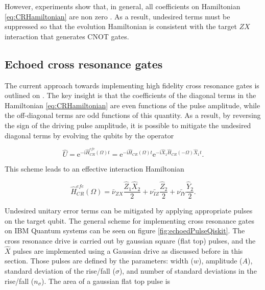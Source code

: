     \noindent However, experiments show that, in general, all coefficients on Hamiltonian \ref{eq:CRHamiltonian} are non zero \cite{DuplicatedRXZPulse, 2016RZXCalibration}. As a result, undesired terms must be suppressed so that the evolution Hamiltonian is consistent with the target $ZX$ interaction that generates CNOT gates.

  \subsection{Echoed cross resonance gates}
  \label{subsec:EchoedCrossResonance}

    The current approach towards implementing high fidelity cross resonance gates is outlined on \cite{DuplicatedRXZPulse}. The key insight is that the coefficients of the diagonal terms in the Hamiltonian \ref{eq:CRHamiltonian} are even functions of the pulse amplitude, while the off-diagonal terms are odd functions of this quantity. As a result, by reversing the sign of the driving pulse amplitude, it is possible to mitigate the undesired diagonal terms by evolving the qubits by the operator

    \begin{equation}
      \hat{U} = \mathrm{e}^{-\mathrm{i}\hat{H}_{CR}^{efe}(\Omega)t} = \mathrm{e}^{-\mathrm{i}\hat{H}_{CR}(\Omega)t} \mathrm{e}^{-\mathrm{i}\hat{X}_1\hat{H}_{CR}(-\Omega)\hat{X}_1t}.
      \label{eq:pulseCREvolution}
    \end{equation}

    \noindent This scheme leads to an effective interaction Hamiltonian \cite{DuplicatedRXZPulse}

    \begin{equation}
      \hat{H}_{CR}^{efe}(\Omega) = \bar{\nu}_{ZX} \frac{\hat{Z}_1\hat{X}_2}{2} + \bar{\nu_{IZ}} \frac{\hat{Z}_2}{2} + \bar{\nu_{IY}} \frac{\hat{Y}_2}{2}.
      \label{eq:effectiveHamiltonian}
    \end{equation}

    Undesired unitary error terms can be mitigated by applying appropriate pulses on the target qubit. The general scheme for implementing cross resonance gates on IBM Quantum systems can be seen on figure \ref{fig:echoedPulseQiskit}. The cross resonance drive is carried out by gaussian square (flat top) pulses, and the $\hat{X}$ pulses are implemented using a Gaussian drive as discussed before in this section. Those pulses are defined by the parameters: width ($w$), amplitude ($A$), standard deviation of the rise/fall ($\sigma$), and number of standard deviations in the rise/fall ($n_\sigma$). The area of a gaussian flat top pulse is

